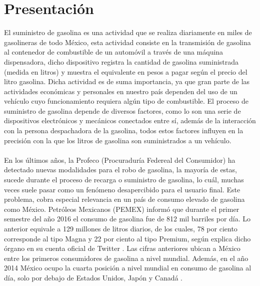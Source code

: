 
\section{Presentación} %
El suministro de gasolina es una actividad que se realiza diariamente en miles de gasolineras de todo México, esta actividad consiste en la transmisión de gasolina al contenedor de combustible de un automóvil a través de una máquina dispensadora, dicho dispositivo registra la cantidad de gasolina suministrada (medida en litros) y muestra el equivalente en pesos a pagar según el precio del litro gasolina.
Dicha actividad es de suma importancia, ya que gran parte de las actividades económicas y personales en nuestro país dependen del uso de un vehículo cuyo funcionamiento requiera algún tipo de combustible. El proceso de suministro de gasolina depende de diversos factores, como lo son una serie de dispositivos electrónicos y mecánicos conectados entre sí, además de la interacción con la persona despachadora de la gasolina, todos estos factores influyen en la precisión con la que los litros de gasolina son suministrados a un vehículo.
\paragraph{}
En los últimos años, la Profeco (Procuraduría Federeal del Consumidor) ha detectado nuevas modalidades para el robo de gasolina, la mayoría de estas, sucede durante el proceso de recarga o suministro de gasolina, lo cuál, muchas veces suele pasar como un fenómeno desapercibido para el usuario final. 
Este problema, cobra especial relevancia en un país de consumo elevado de gasolina como México. Petróleos Mexicanos (PEMEX) informó que durante el primer semestre del año 2016 el consumo de gasolina fue de 812 mil barriles por día. Lo anterior equivale a 129 millones de litros diarios, de los cuales, 78 por ciento corresponde al tipo Magna y 22 por ciento al tipo Premium, según explica dicho órgano en su cuenta oficial de Twitter \citep{Pre1}.
Las cifras anteriores ubican a México entre los primeros consumidores de gasolina a nivel mundial. Además, en el año 2014 México ocupo la cuarta posición a nivel mundial en consumo de gasolina al día, solo por debajo de Estados Unidos, Japón y Canadá \citep{Pre2}.
